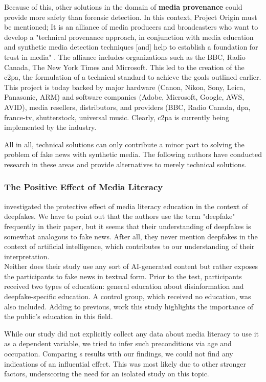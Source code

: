 \documentclass[
  a4paper,  %
  twoside,  %
  bibliography=totoc,
  headsepline,
  cleardoublepage=empty,
  parskip=half,
  draft=false
]{scrbook}
\begin{document}
Because of this, other solutions in the domain of \textbf{media provenance} could provide more safety than forensic detection. In this context, Project Origin must be mentioned; It is an alliance of media producers and broadcasters who want to develop a "technical provenance approach, in conjunction with media education and synthetic media detection techniques [and] help to establish a foundation for trust in media" \cite{ProjectOrigin}. The alliance includes organizations such as the BBC, Radio Canada, The New York Times and Microsoft. This led to the creation of the \gls{c2pa}, the formulation of a technical standard to achieve the goals outlined earlier. This project is today backed by major hardware (Canon, Nikon, Sony, Leica, Panasonic, ARM) and software companies (Adobe, Microsoft, Google, AWS, AVID), media resellers, distributors, and providers (BBC, Radio Canada, dpa, france-tv, shutterstock, universal music. Clearly, \gls{c2pa} is currently being implemented by the industry.

All in all, technical solutions can only contribute a minor part to solving the problem of fake news with synthetic media. The following authors have conducted research in these areas and provide alternatives to merely technical solutions. 

\subsubsection*{The Positive Effect of Media Literacy}
\citeauthor{hwangEffectsDisinformationUsing2021} investigated the protective effect of media literacy education in the context of deepfakes. We have to point out that the authors use the term "deepfake" frequently in their paper, but it seems that their understanding of deepfakes is somewhat analogous to fake news. After all, they never mention deepfakes in the context of artificial intelligence, which contributes to our understanding of their interpretation. \\
Neither does their study use any sort of AI-generated content but rather exposes the participants to fake news in textual form. Prior to the test, participants received two types of education: general education about disinformation and deepfake-specific education. A control group, which received no education, was also included. Adding to previous, work this study highlights the importance of the public's education in this field.

While our study did not explicitly collect any data about media literacy to use it as a dependent variable, we tried to infer such preconditions via age and occupation. Comparing \citeauthor{hwangEffectsDisinformationUsing2021}s results with our findings, we could not find any indications of an influential effect. This was most likely due to other stronger factors, underscoring the need for an isolated study on this topic.
\end{document}
